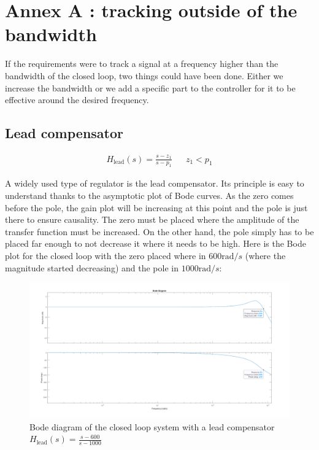 \appendix

\section{Annex A : tracking outside of the bandwidth}
\label{annex:tracking}

If the requirements were to track a signal at a frequency higher than the bandwidth of the closed loop, two things could 
have been done. Either we increase the bandwidth or we add a specific part to the controller for it to be effective 
around the desired frequency.

\subsection{Lead compensator}

\begin{align}
    H_{\text{lead}}(s) = \frac{s - z_1}{s - p_1} && z_1 < p_1
\end{align}

A widely used type of regulator is the lead compensator. Its principle is easy to understand thanks to the asymptotic
plot of Bode curves. As the zero comes before the pole, the gain plot will be increasing at this point and the pole is 
just there to ensure causality. The zero must be placed where the amplitude of the transfer function must be increased. 
On the other hand, the pole simply has to be placed far enough to not decrease it where it needs to be high. Here is the 
Bode plot for the closed loop with the zero placed where in $600 \text{rad}/s$ (where the magnitude started decreasing) 
and the pole in $1000 \text{rad}/s$:

\begin{figure}[H]
    \centering
    \includegraphics[height=\textheight/3]{Pictures/annex_lead_comp.png}
    \caption{Bode diagram of the closed loop system with a lead compensator $H_{\text{lead}}(s) = \frac{s-600}{s-1000}$}
\end{figure}


